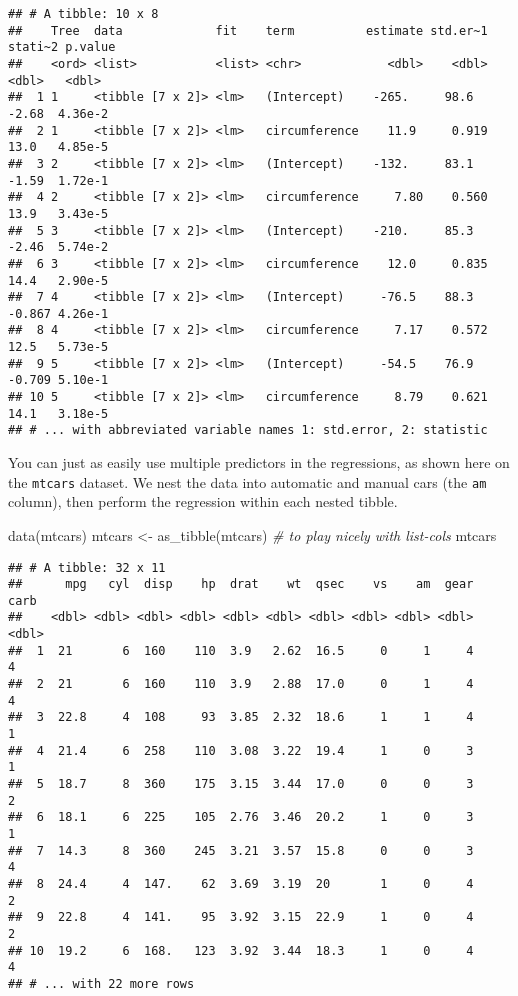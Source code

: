 \documentclass[
]{book}
\newenvironment{Shaded}{\begin{snugshade}}{\end{snugshade}}
\newcommand{\CommentTok}[1]{\textcolor[rgb]{0.56,0.35,0.01}{\textit{#1}}}
\newcommand{\FunctionTok}[1]{\textcolor[rgb]{0.00,0.00,0.00}{#1}}
\newcommand{\NormalTok}[1]{#1}
\newcommand{\OtherTok}[1]{\textcolor[rgb]{0.56,0.35,0.01}{#1}}
\begin{document}
\begin{verbatim}
## # A tibble: 10 x 8
##    Tree  data             fit    term          estimate std.er~1 stati~2 p.value
##    <ord> <list>           <list> <chr>            <dbl>    <dbl>   <dbl>   <dbl>
##  1 1     <tibble [7 x 2]> <lm>   (Intercept)    -265.     98.6    -2.68  4.36e-2
##  2 1     <tibble [7 x 2]> <lm>   circumference    11.9     0.919  13.0   4.85e-5
##  3 2     <tibble [7 x 2]> <lm>   (Intercept)    -132.     83.1    -1.59  1.72e-1
##  4 2     <tibble [7 x 2]> <lm>   circumference     7.80    0.560  13.9   3.43e-5
##  5 3     <tibble [7 x 2]> <lm>   (Intercept)    -210.     85.3    -2.46  5.74e-2
##  6 3     <tibble [7 x 2]> <lm>   circumference    12.0     0.835  14.4   2.90e-5
##  7 4     <tibble [7 x 2]> <lm>   (Intercept)     -76.5    88.3    -0.867 4.26e-1
##  8 4     <tibble [7 x 2]> <lm>   circumference     7.17    0.572  12.5   5.73e-5
##  9 5     <tibble [7 x 2]> <lm>   (Intercept)     -54.5    76.9    -0.709 5.10e-1
## 10 5     <tibble [7 x 2]> <lm>   circumference     8.79    0.621  14.1   3.18e-5
## # ... with abbreviated variable names 1: std.error, 2: statistic
\end{verbatim}

You can just as easily use multiple predictors in the regressions, as shown here on the \texttt{mtcars} dataset. We nest the data into automatic and manual cars (the \texttt{am} column), then perform the regression within each nested tibble.

\begin{Shaded}
\begin{Highlighting}[]
\FunctionTok{data}\NormalTok{(mtcars)}
\NormalTok{mtcars }\OtherTok{\textless{}{-}} \FunctionTok{as\_tibble}\NormalTok{(mtcars) }\CommentTok{\# to play nicely with list{-}cols}
\NormalTok{mtcars}
\end{Highlighting}
\end{Shaded}

\begin{verbatim}
## # A tibble: 32 x 11
##      mpg   cyl  disp    hp  drat    wt  qsec    vs    am  gear  carb
##    <dbl> <dbl> <dbl> <dbl> <dbl> <dbl> <dbl> <dbl> <dbl> <dbl> <dbl>
##  1  21       6  160    110  3.9   2.62  16.5     0     1     4     4
##  2  21       6  160    110  3.9   2.88  17.0     0     1     4     4
##  3  22.8     4  108     93  3.85  2.32  18.6     1     1     4     1
##  4  21.4     6  258    110  3.08  3.22  19.4     1     0     3     1
##  5  18.7     8  360    175  3.15  3.44  17.0     0     0     3     2
##  6  18.1     6  225    105  2.76  3.46  20.2     1     0     3     1
##  7  14.3     8  360    245  3.21  3.57  15.8     0     0     3     4
##  8  24.4     4  147.    62  3.69  3.19  20       1     0     4     2
##  9  22.8     4  141.    95  3.92  3.15  22.9     1     0     4     2
## 10  19.2     6  168.   123  3.92  3.44  18.3     1     0     4     4
## # ... with 22 more rows
\end{verbatim}
\end{document}
